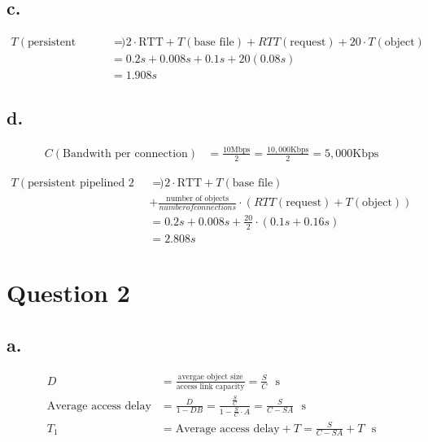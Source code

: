 \documentclass[12pt]{article}
\begin{document}
\subsection{c.}

\begin{align*}
    T(\text{persistent pipelined}) &= 2 \cdot \text{RTT} + T(\text{base file}) + RTT(\text{request}) + 20 \cdot T(\text{object}) \\
    &= 0.2s + 0.008s + 0.1s + 20(0.08s) \\
    &= 1.908s
\end{align*}

\subsection{d.}

\begin{align*}
    C(\text{Bandwith per connection}) &= \frac{10 \text{Mbps}}{2} = \frac{10,000 \text{Kbps}}{2} = 5,000 \text{Kbps}
\end{align*}


\begin{align*}
    T(\text{persistent pipelined 2 TCP}) &= 2 \cdot \text{RTT} + T(\text{base file})  \\
    &+ \frac{\text{number of objects}}{number of connections} \cdot (RTT(\text{request}) + T(\text{object})) \\
    &= 0.2s + 0.008s + \frac{20}{2} \cdot (0.1s + 0.16s) \\
    &= 2.808s
\end{align*}


\section{Question 2}

\subsection{a.}

\begin{align*}
    D &= \frac{\text{avergae object size}}{\text{access link capacity}} = \frac{S}{C}\ \ \ \text{s}\\
    \text{Average access delay} &= \frac{D}{1-DB} = \frac{\frac{S}{C}}{1-\frac{S}{C} \cdot A} = \frac{S}{C-SA}\ \ \ \text{s} \\
    T_1 &= \text{Average access delay} + T = \frac{S}{C-SA} + T \ \ \ \text{s}
\end{align*}
\end{document}
